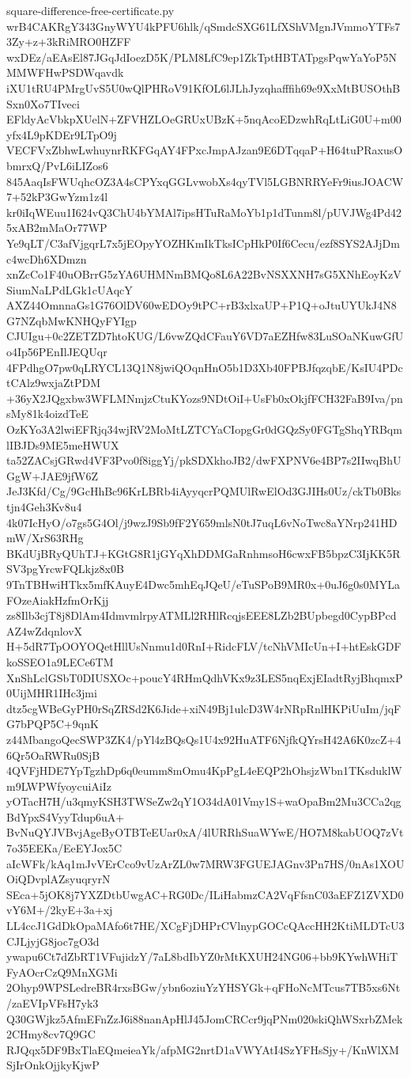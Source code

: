 \documentclass[11pt]{article}
\theoremstyle{definition}
\theoremstyle{remark}
\begin{document}
\begin{filecontents*}[overwrite]{square-difference-free-certificate.py}
wrB4CAKRgY343GnyWYU4kPFU6hlk/qSmdcSXG61LfXShVMgnJVmmoYTFs73Zy+z+3kRiMRO0HZFF
wxDEz/aEAsEl87JGqJdIoezD5K/PLM8LfC9ep1ZkTptHBTATpgsPqwYaYoP5NMMWFHwPSDWqavdk
iXU1tRU4PMrgUvS5U0wQlPHRoV91KfOL6lJLhJyzqhafffih69e9XxMtBUSOthBSxn0Xo7TIveci
EFldyAcVbkpXUelN+ZFVHZLOeGRUxUBzK+5nqAcoEDzwhRqLtLiG0U+m00yfx4L9pKDEr9LTpO9j
VECFVxZbhwLwhuynrRKFGqAY4FPxcJmpAJzan9E6DTqqaP+H64tuPRaxusObmrxQ/PvL6iLIZos6
845AaqIsFWUqhcOZ3A4sCPYxqGGLvwobXs4qyTVl5LGBNRRYeFr9iusJOACW7+52kP3GwYzm1z4l
kr0iIqWEuu1I624vQ3ChU4bYMAl7ipsHTuRaMoYb1p1dTunm8l/pUVJWg4Pd425xAB2mMaOr77WP
Ye9qLT/C3afVjgqrL7x5jEOpyYOZHKmIkTksICpHkP0If6Cecu/ezf8SYS2AJjDmc4wcDh6XDmzn
xnZcCo1F40uOBrrG5zYA6UHMNmBMQo8L6A22BvNSXXNH7sG5XNhEoyKzVSiumNaLPdLGk1cUAqcY
AXZ44OmnnaGs1G76OlDV60wEDOy9tPC+rB3xlxaUP+P1Q+oJtuUYUkJ4N8G7NZqbMwKNHQyFYIgp
CJUIgu+0c2ZETZD7htoKUG/L6vwZQdCFauY6VD7aEZHfw83LuSOaNKuwGfUo4Ip56PEnIlJEQUqr
4FPdhgO7pw0qLRYCL13Q1N8jwiQOqnHnO5b1D3Xb40FPBJfqzqbE/KsIU4PDctCAlz9wxjaZtPDM
+36yX2JQgxbw3WFLMNmjzCtuKYozs9NDtOiI+UsFb0xOkjfFCH32FaB9Iva/pnsMy81k4oizdTeE
OzKYo3A2lwiEFRjq34wjRV2MoMtLZTCYaCIopgGr0dGQzSy0FGTgShqYRBqmlIBJDs9ME5meHWUX
ta52ZACsjGRwd4VF3Pvo0f8iggYj/pkSDXkhoJB2/dwFXPNV6e4BP7s2IIwqBhUGgW+JAE9jfW6Z
JeJ3Kfd/Cg/9GcHhBc96KrLBRb4iAyyqcrPQMUlRwElOd3GJIHs0Uz/ckTb0Bkstjn4Geh3Kv8u4
4k07IcHyO/o7gs5G4Ol/j9wzJ9Sb9fF2Y659mlsN0tJ7uqL6vNoTwc8aYNrp241HDmW/XrS63RHg
BKdUjBRyQUhTJ+KGtG8R1jGYqXhDDMGaRnhmsoH6cwxFB5bpzC3IjKK5RSV3pgYrcwFQLkjz8x0B
9TnTBHwiHTkx5mfKAuyE4Dwc5mhEqJQeU/eTuSPoB9MR0x+0uJ6g0s0MYLaFOzeAiakHzfmOrKjj
zs8Ilb3cjT8j8DlAm4IdmvmlrpyATMLl2RHlRcqjsEEE8LZb2BUpbegd0CypBPcdAZ4wZdqnlovX
H+5dR7TpOOYOQetHllUsNnmu1d0RnI+RidcFLV/tcNhVMIcUn+I+htEskGDFkoSSEO1a9LECe6TM
XnShLclGSbT0DIUSXOc+poucY4RHmQdhVKx9z3LES5nqExjEIadtRyjBhqmxP0UijMHR1IHc3jmi
dtz5cgWBeGyPH0rSqZRSd2K6Jide+xiN49Bj1ulcD3W4rNRpRnlHKPiUuIm/jqFG7bPQP5C+9qnK
z44MbangoQecSWP3ZK4/pYl4zBQsQs1U4x92HuATF6NjfkQYrsH42A6K0zcZ+46Qr5OaRWRu0SjB
4QVFjHDE7YpTgzhDp6q0eumm8mOmu4KpPgL4eEQP2hOhsjzWbn1TKsduklWm9LWPWfyoycuiAiIz
yOTacH7H/u3qmyKSH3TWSeZw2qY1O34dA01Vmy1S+waOpaBm2Mu3CCa2qgBdYpxS4VyyTdup6uA+
BvNuQYJVBvjAgeByOTBTeEUar0xA/4lURRhSuaWYwE/HO7M8kabUOQ7zVt7o35EEKa/EeEYJox5C
aIcWFk/kAq1mJvVErCco9vUzArZL0w7MRW3FGUEJAGnv3Pn7HS/0nAs1XOUOiQDvplAZsyuqryrN
SEca+5jOK8j7YXZDtbUwgAC+RG0Dc/ILiHabmzCA2VqFfsnC03aEFZ1ZVXD0vY6M+/2kyE+3a+xj
LL4ccJ1GdDkOpaMAfo6t7HE/XCgFjDHPrCVlnypGOCcQAccHH2KtiMLDTcU3CJLjyjG8joc7gO3d
ywapu6Ct7dZbRT1VFujidzY/7aL8bdIbYZ0rMtKXUH24NG06+bb9KYwhWHiTFyAOcrCzQ9MnXGMi
2Ohyp9WPSLedreBR4rxsBGw/ybn6oziuYzYHSYGk+qFHoNcMTcus7TB5xs6Nt/zaEVIpVFsH7yk3
Q30GWjkz5AfmEFnZzJ6i88nanApHlJ45JomCRCcr9jqPNm020skiQhWSxrbZMek2CHmy8cv7Q9GC
RJQqx5DF9BxTlaEQmeieaYk/afpMG2nrtD1aVWYAtI4SzYFHsSjy+/KnWlXMSjIrOnkOjjkyKjwP

\end{filecontents*}
\end{document}
